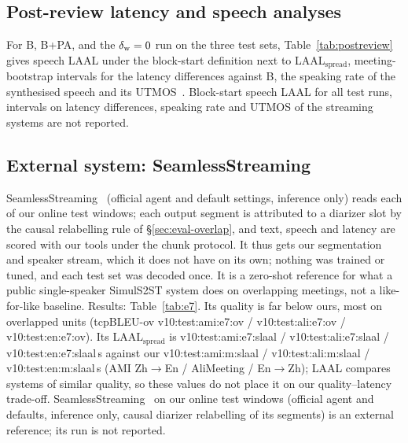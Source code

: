 \subsection{Post-review latency and speech analyses}
\label{app:postreview}

\ifPostReview
For B, B+PA, \sys{} and the $\delta_{\mathrm{w}}=0$ run on the three test sets, Table~\ref{tab:postreview} gives speech LAAL under the
block-start definition next to LAAL$_\text{spread}$, meeting-bootstrap intervals for the latency differences against B,
the speaking rate of the synthesised speech and its UTMOS~\citep{saeki2022utmos}.
\else
Block-start speech LAAL for all test runs, intervals on latency differences, speaking rate and UTMOS of the streaming
systems are not reported.
\fi

\subsection{External system: SeamlessStreaming}
\label{app:e7}

\ifEseven
SeamlessStreaming~\citep{seamless2023} (official agent and default settings, inference only) reads each of our online
test windows; each output segment is attributed to a diarizer slot by the causal relabelling rule of
\S\ref{sec:eval-overlap}, and text, speech and latency are scored with our tools under the chunk protocol. It thus gets our
segmentation and speaker stream, which it does not have on its own; nothing was trained or tuned, and each test set was
decoded once. It is a zero-shot reference for what a public single-speaker SimulS2ST system does on overlapping
meetings, not a like-for-like baseline. Results: Table~\ref{tab:e7}.
 Its quality is far below ours, most on
overlapped units (tcpBLEU-ov \num{v10:test:ami:e7:ov} / \num{v10:test:ali:e7:ov} / \num{v10:test:en:e7:ov}). Its
LAAL$_\text{spread}$ is \num{v10:test:ami:e7:slaal} / \num{v10:test:ali:e7:slaal} / \num{v10:test:en:e7:slaal}\,s against our
\num{v10:test:ami:m:slaal} / \num{v10:test:ali:m:slaal} / \num{v10:test:en:m:slaal}\,s (AMI Zh$\rightarrow$En /
AliMeeting / En$\rightarrow$Zh); LAAL compares systems of similar quality, so these values do not place it on our
quality--latency trade-off.
\else
SeamlessStreaming~\citep{seamless2023} on our online test windows (official agent and defaults, inference only, causal
diarizer relabelling of its segments) is an external reference; its run is not reported.
\fi


